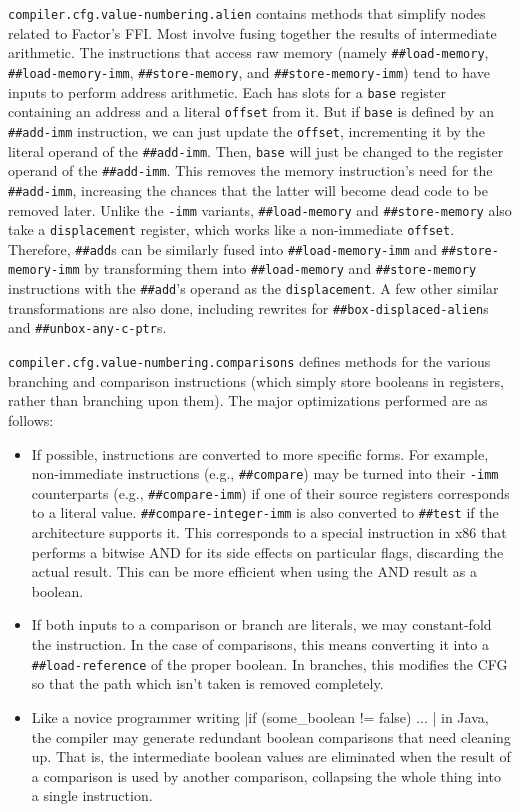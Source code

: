 \Verb|compiler.cfg.value-numbering.alien| contains methods that simplify
nodes related to Factor's \gls{FFI}.  Most involve fusing together the results
of intermediate arithmetic.  The instructions that access raw memory (namely
\Verb|##load-memory|, \Verb|##load-memory-imm|, \Verb|##store-memory|,
and \Verb|##store-memory-imm|) tend to have inputs to perform address
arithmetic.  Each has slots for a \Verb|base| register containing an address
and a literal \Verb|offset| from it.  But if \Verb|base| is defined by an
\Verb|##add-imm| instruction, we can just update the \Verb|offset|,
incrementing it by the literal operand of the \Verb|##add-imm|.  Then,
\Verb|base| will just be changed to the register operand of the
\Verb|##add-imm|.  This removes the memory instruction's need for the
\Verb|##add-imm|, increasing the chances that the latter will become dead
code to be removed later.  Unlike the \Verb|-imm| variants,
\Verb|##load-memory| and \Verb|##store-memory| also take a
\Verb|displacement| register, which works like a non-immediate
\Verb|offset|.  Therefore, \Verb|##add|s can be similarly fused into
\Verb|##load-memory-imm| and \Verb|##store-memory-imm| by transforming them
into \Verb|##load-memory| and \Verb|##store-memory| instructions with the
\Verb|##add|'s operand as the \Verb|displacement|.  A few other similar
transformations are also done, including rewrites for
\Verb|##box-displaced-alien|s and \Verb|##unbox-any-c-ptr|s.

\Verb|compiler.cfg.value-numbering.comparisons| defines methods for the
various branching and comparison instructions (which simply store booleans in
registers, rather than branching upon them).  The major optimizations performed
are as follows:
%
\begin{itemize}
%
\item If possible, instructions are converted to more specific forms.  For
example, non-immediate instructions (e.g., \Verb|##compare|) may be turned
into their \Verb|-imm| counterparts (e.g., \Verb|##compare-imm|)  if one of
their source registers corresponds to a literal value.
\Verb|##compare-integer-imm| is also converted to \Verb|##test| if the
architecture supports it.  This corresponds to a special instruction in x86
that performs a bitwise AND for its side effects on particular flags,
discarding the actual result.  This can be more efficient when using the AND
result as a boolean.
%
\item If both inputs to a comparison or branch are literals, we may
constant-fold the instruction.  In the case of comparisons, this means
converting it into a \Verb|##load-reference| of the proper boolean.  In
branches, this modifies the \gls{CFG} so that the path which isn't taken is
removed completely.
%
\item Like a novice programmer writing
%
|if (some_boolean != false) { ... }|
%
in Java, the compiler may generate redundant boolean comparisons that need
cleaning up.  That is, the intermediate boolean values are eliminated when the
result of a comparison is used by another comparison, collapsing the whole
thing into a single instruction.
%
\end{itemize}

